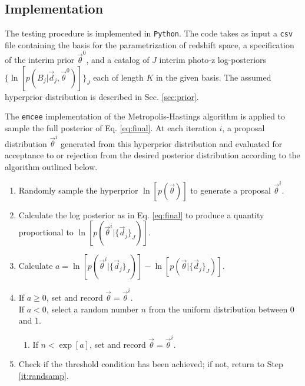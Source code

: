 \documentclass[preprint]{aastex}
\begin{document}
\begin{figure}
\caption{}
\label{fig:datapzs}
\end{figure}

\clearpage
\subsection{Implementation}
\label{sec:mcmc}

The testing procedure is implemented in \texttt{Python}.  The code takes as 
input a \texttt{csv} file containing the basis for the parametrization of 
redshift space, a specification of the interim prior $\vec{\theta}^{0}$, and a 
catalog of $J$ interim photo-z log-posteriors 
$\{\ln[p(B_{j}|\vec{d}_{j},\vec{\theta}^{0})]\}_{J}$ each of length $K$ in the 
given basis.  The assumed hyperprior distribution is described in Sec. 
\ref{sec:prior}.

The \texttt{emcee} implementation of the Metropolis-Hastings algorithm is 
applied to sample the full posterior of Eq. \ref{eq:final}.   
\citep{Foreman-Mackey2013}   At each iteration $i$, a proposal distribution 
$\vec{\theta}^{i}$ generated from this hyperprior distribution and evaluated 
for acceptance to or rejection from the desired posterior distribution 
according to the algorithm outlined below.  

\begin{enumerate}
\item \label{it:randsamp} Randomly sample the hyperprior $\ln[p(\vec{\theta})]$ 
to generate a proposal $\vec{\theta}^{i}$.
\item Calculate the log posterior as in Eq. \ref{eq:final} to produce a 
quantity proportional to $\ln[p(\vec{\theta}^{i}|\{\vec{d}_{j}\}_{J})]$.
\item Calculate 
$a=\ln[p(\vec{\theta}^{i}|\{\vec{d}_{j}\}_{J})]-\ln[p(\vec{\theta}|\{\vec{d}_{j}
\}_{J})]$.
\item If $a\geq0$, set and record $\vec{\theta}=\vec{\theta}^{i}$.\\
If $a<0$, select a random number $n$ from the uniform distribution between 0 
and 1.
\begin{enumerate}
\item If $n<\exp[a]$, set and record $\vec{\theta}=\vec{\theta}^{i}$.
\end{enumerate}
\item Check if the threshold condition has been achieved; if not, return to 
Step \ref{it:randsamp}.
\end{enumerate}
\end{document}
